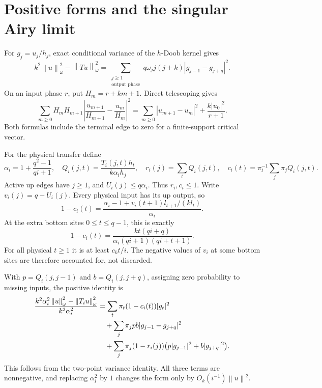 \documentclass[11pt,letterpaper]{article}
\numberwithin{equation}{section}
\theoremstyle{remark}
\newcommand{\norm}[1]{\left\lVert#1\right\rVert}
\begin{document}
\section{Positive forms and the singular Airy limit}
For $g_j=u_j/h_j$, exact conditional variance of the $h$-Doob kernel gives
\begin{equation}\label{air:ka:eq:variance}
 k^2\norm{u}_\omega^2-\norm{Tu}_\omega^2
 =\sum_{\substack{j\ge1\\\text{output phase}}}
 q\omega_jj(j+k)|g_{j-1}-g_{j+q}|^2.
\end{equation}
On an input phase $r$, put $H_m=r+km+1$. Direct telescoping gives
\begin{equation}\label{air:ka:eq:trace}
 \sum_{m\ge0}H_mH_{m+1}
 \left|\frac{u_{m+1}}{H_{m+1}}-\frac{u_m}{H_m}\right|^2
 =\sum_{m\ge0}|u_{m+1}-u_m|^2+\frac{k|u_0|^2}{r+1}.
\end{equation}
Both formulas include the terminal edge to zero for a finite-support critical vector.

For the physical transfer define
\[
 \alpha_i=1+\frac{q^2-1}{qi+1},\quad
 Q_i(j,t)=\frac{T_i(j,t)h_t}{k\alpha_i h_j},\quad
 r_i(j)=\sum_tQ_i(j,t),\quad
 c_i(t)=\pi_t^{-1}\sum_j\pi_jQ_i(j,t).
\]
Active up edges have $j\ge1$, and $U_i(j)\le q\alpha_i$. Thus $r_i,c_i\le1$. Write $v_i(j)=q-U_i(j)$. Every physical input has its up output, so
\begin{equation}\label{air:ka:eq:column}
 1-c_i(t)=\frac{\alpha_i-1+v_i(t+1)l_{t+1}/(kl_t)}{\alpha_i}.
\end{equation}
At the extra bottom sites $0\le t\le q-1$, this is exactly
\[
 1-c_i(t)=\frac{kt(qi+q)}{\alpha_i(qi+1)(qi+t+1)}.
\]
For all physical $t\ge1$ it is at least $c_kt/i$. The negative values of $v_i$ at some bottom sites are therefore accounted for, not discarded.

With $p=Q_i(j,j-1)$ and $b=Q_i(j,j+q)$, assigning zero probability to missing inputs, the positive identity is
\begin{align}\label{air:ka:eq:positive}
 \frac{k^2\alpha_i^2\norm{u}_\omega^2-\norm{T_iu}_\omega^2}
 {k^2\alpha_i^2}
 &=\sum_t\pi_t(1-c_i(t))|g_t|^2\notag\\
 &\quad+\sum_j\pi_jpb|g_{j-1}-g_{j+q}|^2\notag\\
 &\quad+\sum_j\pi_j(1-r_i(j))
       \bigl(p|g_{j-1}|^2+b|g_{j+q}|^2\bigr).
\end{align}
This follows from the two-point variance identity. All three terms are nonnegative, and replacing $\alpha_i^2$ by $1$ changes the form only by $O_k(i^{-1})\norm{u}^2$.
\end{document}
